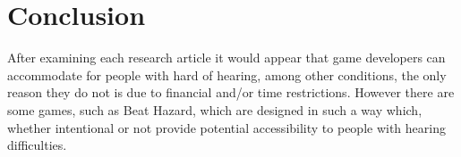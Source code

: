 \documentclass{scrartcl}
\begin{document}
\section{Conclusion}
After examining each research article it would appear that game developers can accommodate for people with hard of hearing, among other conditions, the only reason they do not is due to
financial and/or time restrictions. However there are some games, such as Beat Hazard, which are designed in such a way which, whether intentional or not provide potential accessibility to people with hearing difficulties. 



\end{document}
